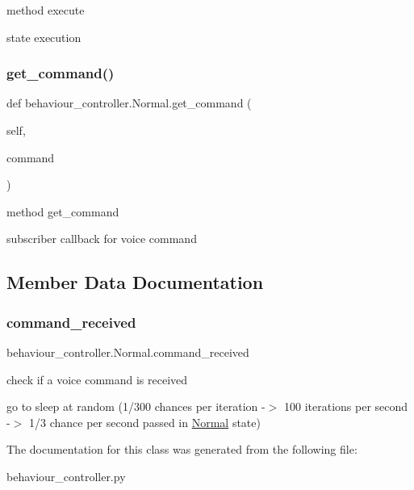 method execute 

state execution \mbox{\label{classbehaviour__controller_1_1Normal_afc29036dc946ac6c711417da07ca8690}} 
\subsubsection{\texorpdfstring{get\+\_\+command()}{get\_command()}}
{\footnotesize\ttfamily def behaviour\+\_\+controller.\+Normal.\+get\+\_\+command (\begin{DoxyParamCaption}\item[{}]{self,  }\item[{}]{command }\end{DoxyParamCaption})}



method get\+\_\+command 

subscriber callback for voice command 

\subsection{Member Data Documentation}
\mbox{\label{classbehaviour__controller_1_1Normal_a52be6081cfd23a5661fb4304774f1d17}} 
\subsubsection{\texorpdfstring{command\+\_\+received}{command\_received}}
{\footnotesize\ttfamily behaviour\+\_\+controller.\+Normal.\+command\+\_\+received}



check if a voice command is received 

go to sleep at random (1/300 chances per iteration -\/$>$ 100 iterations per second -\/$>$ 1/3 chance per second passed in \hyperlink{classbehaviour__controller_1_1Normal}{Normal} state) 

The documentation for this class was generated from the following file\+:\begin{DoxyCompactItemize}
\item 
behaviour\+\_\+controller.\+py\end{DoxyCompactItemize}
